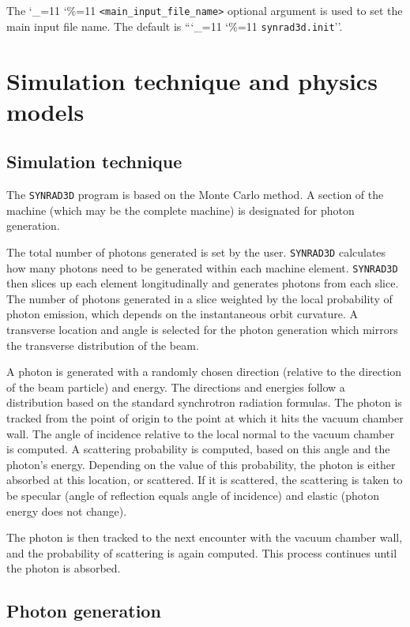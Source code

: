 \documentclass[11pt]{article}
\newcommand{\srthree}{\texttt{SYNRAD3D}\xspace}
\newcommand\ttcmd{\begingroup\catcode`\_=11 \catcode`\%=11 \dottcmd}
\newcommand\dottcmd[1]{\texttt{#1}\endgroup}
\newcommand{\vn}{\ttcmd}
\begin{document}
The \vn{<main_input_file_name>} optional argument is used to set the
main input file name. The default is ``\vn{synrad3d.init}''. 


\section{Simulation technique and physics models}
\subsection{Simulation technique} 

The \srthree program is based on the Monte
Carlo method. A section of the machine (which may be the complete machine)
is designated for photon generation.

The total number of photons generated is set by the user. \srthree
calculates how many photons need to be generated within each machine
element. \srthree then slices up each element longitudinally and
generates photons from each slice. The number of photons generated in
a slice weighted by the local probability of photon emission, which
depends on the instantaneous orbit curvature. A transverse location
and angle is selected for the photon generation which mirrors the
transverse distribution of the beam.

A photon is generated with a randomly chosen direction (relative to
the direction of the beam particle) and energy. The directions and
energies follow a distribution based on the standard synchrotron
radiation formulas. The photon is tracked from the point of origin to
the point at which it hits the vacuum chamber wall. The angle of
incidence relative to the local normal to the vacuum chamber is
computed. A scattering probability is computed, based on this angle
and the photon's energy. Depending on the value of this probability,
the photon is either absorbed at this location, or scattered. If it is
scattered, the scattering is taken to be specular (angle of reflection
equals angle of incidence) and elastic (photon energy does not
change).

The photon is then tracked to the next encounter with the vacuum
chamber wall, and the probability of scattering is again
computed. This process continues until the photon is absorbed.

\subsection{Photon generation}
\end{document}
